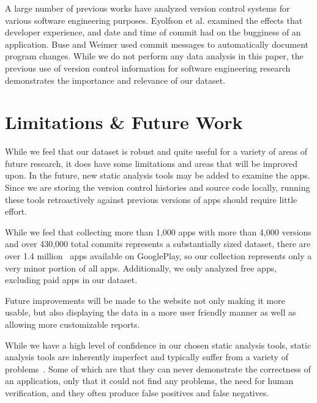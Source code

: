 \documentclass[journal,transmag]{IEEEtran}
\newcommand{\dan}[1]{\textcolor{blue}{{\it [Dan says: #1]}}}
\begin{document}
A large number of previous works have analyzed version control systems for various software engineering purposes. Eyolfson et al.\cite{Eyolfson:2011:TDD:1985441.1985464} examined the effects that developer experience, and date and time of commit had on the bugginess of an application. Buse and Weimer\cite{Buse:2010:ADP:1858996.1859005} used commit messages to automatically document program changes. While we do not perform any data analysis in this paper, the previous use of version control information for software engineering research demonstrates the importance and relevance of our dataset.



\section{Limitations \& Future Work}
\label{sec: Limitations}


While we feel that our dataset is robust and quite useful for a variety of areas of future research, it does have some limitations and areas that will be improved upon. In the future, new static analysis tools may be added to examine the apps. Since we are storing the version control histories and source code locally, running these tools retroactively against previous versions of apps should require little effort.

While we feel that collecting more than 1,000 apps with more than 4,000 versions and over 430,000 total commits represents a substantially sized dataset, there are over 1.4 million~\cite{appBrain_stats} apps available on GooglePlay, so our collection represents only a very minor portion of all apps. Additionally, we only analyzed free apps, excluding paid apps in our dataset.

Future improvements will be made to the website not only making it more usable, but also displaying the data in a more user friendly manner as well as allowing more customizable reports.

While we have a high level of confidence in our chosen static analysis tools, static analysis tools are inherently imperfect and typically suffer from a variety of problems~\cite{chess2004static}. Some of which are that they can never demonstrate the correctness of an application, only that it could not find any problems, the need for human verification, and they often produce false positives and false negatives.
\end{document}
